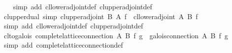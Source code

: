\begin{isabellebody}
%
\isadelimproof
\ \ %
\endisadelimproof
%
\isatagproof
{}\isamarkupfalse%
\ {}simp\ add{}\ cl{}lower{}adjoint{}def\ cl{}upper{}adjoint{}def{}%
\endisatagproof
{\isafoldproof}%
%
\isadelimproof
\isanewline
%
\endisadelimproof
\isanewline
{}\isamarkupfalse%
\ cl{}upper{}dual\ {}simp{}{}\ {}cl{}upper{}adjoint\ {}B{}{}\ {}A{}{}\ f\ {}\ cl{}lower{}adjoint\ A\ B\ f{}\isanewline
%
\isadelimproof
\ \ %
\endisadelimproof
%
\isatagproof
{}\isamarkupfalse%
\ {}simp\ add{}\ cl{}lower{}adjoint{}def\ cl{}upper{}adjoint{}def{}%
\endisatagproof
{\isafoldproof}%
%
\isadelimproof
\isanewline
%
\endisadelimproof
\isanewline
{}\isamarkupfalse%
\ cl{}to{}galois{}\ {}complete{}lattice{}connection\ A\ B\ f\ g\ {}\ galois{}connection\ A\ B\ f\ g{}\isanewline
%
\isadelimproof
\ \ %
\endisadelimproof
%
\isatagproof
{}\isamarkupfalse%
\ {}simp\ add{}\ complete{}lattice{}connection{}def{}%

\end{isabellebody}
